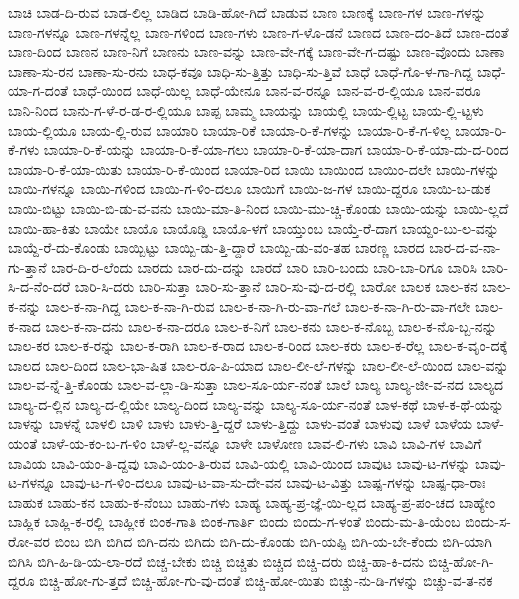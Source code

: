 {ಬಾಚಿ
ಬಾಡ-ದಿ-ರುವ
ಬಾಡ-ಲಿಲ್ಲ
ಬಾಡಿದ
ಬಾಡಿ-ಹೋ-ಗಿದೆ
ಬಾಡುವ
ಬಾಣ
ಬಾಣಕ್ಕೆ
ಬಾಣ-ಗಳ
ಬಾಣ-ಗಳನ್ನು
ಬಾಣ-ಗಳನ್ನೂ
ಬಾಣ-ಗಳನ್ನೆಲ್ಲ
ಬಾಣ-ಗಳಿಂದ
ಬಾಣ-ಗಳು
ಬಾಣ-ಗ-ಳೊ-ಡನೆ
ಬಾಣದ
ಬಾಣ-ದಂ-ತಿದೆ
ಬಾಣ-ದಂತೆ
ಬಾಣ-ದಿಂದ
ಬಾಣನ
ಬಾಣ-ನಿಗೆ
ಬಾಣನು
ಬಾಣ-ವನ್ನು
ಬಾಣ-ವೇ-ಗಕ್ಕೆ
ಬಾಣ-ವೇ-ಗ-ದಷ್ಟು
ಬಾಣ-ವೊಂದು
ಬಾಣಾ
ಬಾಣಾ-ಸು-ರನ
ಬಾಣಾ-ಸು-ರನು
ಬಾಧ-ಕವೂ
ಬಾಧಿ-ಸು-ತ್ತಿತ್ತು
ಬಾಧಿ-ಸು-ತ್ತಿವೆ
ಬಾಧೆ
ಬಾಧೆ-ಗೊ-ಳ-ಗಾ-ಗಿದ್ದ
ಬಾಧೆ-ಯಾ-ಗ-ದಂತೆ
ಬಾಧೆ-ಯಿಂದ
ಬಾಧೆ-ಯಿಲ್ಲ
ಬಾಧೆ-ಯೇನೂ
ಬಾನ-ವ-ರನ್ನೂ
ಬಾನ-ವ-ರ-ಲ್ಲಿಯೂ
ಬಾನ-ವರೂ
ಬಾನಿ-ನಿಂದ
ಬಾನು-ಗ-ಳೆ-ರ-ಡ-ರ-ಲ್ಲಿಯೂ
ಬಾಪ್ಪ
ಬಾಮ್ಮ
ಬಾಯನ್ನು
ಬಾಯಲ್ಲಿ
ಬಾಯ-ಲ್ಲಿಟ್ಟ
ಬಾಯ-ಲ್ಲಿ-ಟ್ಟಳು
ಬಾಯ-ಲ್ಲಿಯೂ
ಬಾಯ-ಲ್ಲಿ-ರುವ
ಬಾಯಾರಿ
ಬಾಯಾ-ರಿಕೆ
ಬಾಯಾ-ರಿ-ಕೆ-ಗಳನ್ನು
ಬಾಯಾ-ರಿ-ಕೆ-ಗ-ಳಿಲ್ಲ
ಬಾಯಾ-ರಿ-ಕೆ-ಗಳು
ಬಾಯಾ-ರಿ-ಕೆ-ಯನ್ನು
ಬಾಯಾ-ರಿ-ಕೆ-ಯಾ-ಗಲು
ಬಾಯಾ-ರಿ-ಕೆ-ಯಾ-ದಾಗ
ಬಾಯಾ-ರಿ-ಕೆ-ಯಾ-ದು-ದ-ರಿಂದ
ಬಾಯಾ-ರಿ-ಕೆ-ಯಾ-ಯಿತು
ಬಾಯಾ-ರಿ-ಕೆ-ಯಿಂದ
ಬಾಯಾ-ರಿದ
ಬಾಯಿ
ಬಾಯಿಂದ
ಬಾಯಿಂ-ದಲೇ
ಬಾಯಿ-ಗಳನ್ನು
ಬಾಯಿ-ಗಳನ್ನೂ
ಬಾಯಿ-ಗಳಿಂದ
ಬಾಯಿ-ಗ-ಳಿಂ-ದಲೂ
ಬಾಯಿಗೆ
ಬಾಯಿ-ಜ-ಗಳ
ಬಾಯಿ-ದ್ದರೂ
ಬಾಯಿ-ಬ-ಡುಕ
ಬಾಯಿ-ಬಿಟ್ಟು
ಬಾಯಿ-ಬಿ-ಡು-ವ-ವನು
ಬಾಯಿ-ಮಾ-ತಿ-ನಿಂದ
ಬಾಯಿ-ಮು-ಚ್ಚಿ-ಕೊಂಡು
ಬಾಯಿ-ಯನ್ನು
ಬಾಯಿ-ಲ್ಲದೆ
ಬಾಯಿ-ಹಾ-ಕಿತು
ಬಾಯೇ
ಬಾಯೊ
ಬಾಯೊಡ್ಡಿ
ಬಾಯೊ-ಳಗೆ
ಬಾಯ್ತುಂಬ
ಬಾಯ್ತೆ-ರೆ-ದಾಗ
ಬಾಯ್ದಂ-ಬು-ಲ-ವನ್ನು
ಬಾಯ್ದೆ-ರೆ-ದು-ಕೊಂಡು
ಬಾಯ್ಬಿಟ್ಟು
ಬಾಯ್ಬಿ-ಡು-ತ್ತಿ-ದ್ದಾರೆ
ಬಾಯ್ಬಿ-ಡು-ವಂ-ತಹ
ಬಾರಣ್ಣ
ಬಾರದ
ಬಾರ-ದ-ವ-ನಾ-ಗು-ತ್ತಾನೆ
ಬಾರ-ದಿ-ರ-ಲೆಂದು
ಬಾರದು
ಬಾರ-ದು-ದನ್ನು
ಬಾರದೆ
ಬಾರಿ
ಬಾರಿ-ಬಂದು
ಬಾರಿ-ಬಾ-ರಿಗೂ
ಬಾರಿಸಿ
ಬಾರಿ-ಸಿ-ದ-ನೆಂ-ದರೆ
ಬಾರಿ-ಸಿ-ದರು
ಬಾರಿ-ಸುತ್ತಾ
ಬಾರಿ-ಸು-ತ್ತಾನೆ
ಬಾರಿ-ಸು-ವು-ದ-ರಲ್ಲಿ
ಬಾರೋ
ಬಾಲಕ
ಬಾಲ-ಕನ
ಬಾಲ-ಕ-ನನ್ನು
ಬಾಲ-ಕ-ನಾ-ಗಿದ್ದ
ಬಾಲ-ಕ-ನಾ-ಗಿ-ರುವ
ಬಾಲ-ಕ-ನಾ-ಗಿ-ರು-ವಾ-ಗಲೆ
ಬಾಲ-ಕ-ನಾ-ಗಿ-ರು-ವಾ-ಗಲೇ
ಬಾಲ-ಕ-ನಾದ
ಬಾಲ-ಕ-ನಾ-ದನು
ಬಾಲ-ಕ-ನಾ-ದರೂ
ಬಾಲ-ಕ-ನಿಗೆ
ಬಾಲ-ಕನು
ಬಾಲ-ಕ-ನೊಬ್ಬ
ಬಾಲ-ಕ-ನೊ-ಬ್ಬ-ನನ್ನು
ಬಾಲ-ಕರ
ಬಾಲ-ಕ-ರನ್ನು
ಬಾಲ-ಕ-ರಾಗಿ
ಬಾಲ-ಕ-ರಾದ
ಬಾಲ-ಕ-ರಿಂದ
ಬಾಲ-ಕರು
ಬಾಲ-ಕ-ರೆಲ್ಲ
ಬಾಲ-ಕ-ವೃಂ-ದಕ್ಕೆ
ಬಾಲದ
ಬಾಲ-ದಿಂದ
ಬಾಲ-ಭಾ-ಷಿತ
ಬಾಲ-ರೂ-ಪಿ-ಯಾದ
ಬಾಲ-ಲೀ-ಲೆ-ಗಳನ್ನು
ಬಾಲ-ಲೀ-ಲೆ-ಯಿಂದ
ಬಾಲ-ವನ್ನು
ಬಾಲ-ವ-ನ್ನೆ-ತ್ತಿ-ಕೊಂಡು
ಬಾಲ-ವ-ಲ್ಲಾ-ಡಿ-ಸುತ್ತಾ
ಬಾಲ-ಸೂ-ರ್ಯ-ನಂತೆ
ಬಾಲೆ
ಬಾಲ್ಯ
ಬಾಲ್ಯ-ಜೀ-ವ-ನದ
ಬಾಲ್ಯದ
ಬಾಲ್ಯ-ದ-ಲ್ಲಿನ
ಬಾಲ್ಯ-ದ-ಲ್ಲಿಯೇ
ಬಾಲ್ಯ-ದಿಂದ
ಬಾಲ್ಯ-ವನ್ನು
ಬಾಲ್ಯ-ಸೂ-ರ್ಯ-ನಂತೆ
ಬಾಳ-ಕಥೆ
ಬಾಳ-ಕ-ಥೆ-ಯನ್ನು
ಬಾಳನ್ನು
ಬಾಳನ್ನೆ
ಬಾಳಲಿ
ಬಾಳಿ
ಬಾಳು
ಬಾಳು-ತ್ತಿ-ದ್ದರೆ
ಬಾಳು-ತ್ತಿದ್ದು
ಬಾಳು-ವಂತೆ
ಬಾಳುವು
ಬಾಳೆ
ಬಾಳೆಯ
ಬಾಳೆ-ಯಂತೆ
ಬಾಳೆ-ಯ-ಕಂ-ಬ-ಗ-ಳಿಂ
ಬಾಳೆ-ಲ್ಲ-ವನ್ನೂ
ಬಾಳೇ
ಬಾಳೋಣ
ಬಾವ-ಲಿ-ಗಳು
ಬಾವಿ
ಬಾವಿ-ಗಳ
ಬಾವಿಗೆ
ಬಾವಿಯ
ಬಾವಿ-ಯಂ-ತಿ-ದ್ದವು
ಬಾವಿ-ಯಂ-ತಿ-ರುವ
ಬಾವಿ-ಯಲ್ಲಿ
ಬಾವಿ-ಯಿಂದ
ಬಾವುಟ
ಬಾವು-ಟ-ಗಳನ್ನು
ಬಾವು-ಟ-ಗಳನ್ನೂ
ಬಾವು-ಟ-ಗ-ಳಿಂ-ದಲೂ
ಬಾವು-ಟ-ವಾ-ಸು-ದೇ-ವನ
ಬಾವು-ಟ-ವಿತ್ತು
ಬಾಷ್ಪ-ಗಳನ್ನು
ಬಾಷ್ಪ-ಧಾ-ರಾಃ
ಬಾಹುಕ
ಬಾಹು-ಕನ
ಬಾಹು-ಕ-ನೆಂಬು
ಬಾಹು-ಗಳು
ಬಾಹ್ಯ
ಬಾಹ್ಯ-ಪ್ರ-ಜ್ಞೆ-ಯಿ-ಲ್ಲದ
ಬಾಹ್ಯ-ಪ್ರ-ಪಂ-ಚದ
ಬಾಹ್ಯೇಂ
ಬಾಹ್ಲಿಕ
ಬಾಹ್ಲಿ-ಕ-ರಲ್ಲಿ
ಬಾಹ್ಲೀಕ
ಬಿಂಕ-ಗಾತಿ
ಬಿಂಕ-ಗಾರ್ತಿ
ಬಿಂದು
ಬಿಂದು-ಗ-ಳಂತೆ
ಬಿಂದು-ಮ-ತಿ-ಯೆಂಬ
ಬಿಂದು-ಸ-ರೋ-ವರ
ಬಿಂಬ
ಬಿಗಿ
ಬಿಗಿದ
ಬಿಗಿ-ದನು
ಬಿಗಿದು
ಬಿಗಿ-ದು-ಕೊಂಡು
ಬಿಗಿ-ಯಪ್ಪಿ
ಬಿಗಿ-ಯ-ಬೇ-ಕೆಂದು
ಬಿಗಿ-ಯಾಗಿ
ಬಿಗಿಸಿ
ಬಿಗಿ-ಹಿ-ಡಿ-ಯ-ಲಾ-ರದೆ
ಬಿಚ್ಚ-ಬೇಕು
ಬಿಚ್ಚಿ
ಬಿಚ್ಚಿತು
ಬಿಚ್ಚಿದ
ಬಿಚ್ಚಿ-ದರು
ಬಿಚ್ಚಿ-ಹಾ-ಕಿ-ದನು
ಬಿಚ್ಚಿ-ಹೋ-ಗಿ-ದ್ದರೂ
ಬಿಚ್ಚಿ-ಹೋ-ಗು-ತ್ತದೆ
ಬಿಚ್ಚಿ-ಹೋ-ಗು-ವು-ದಂತೆ
ಬಿಚ್ಚಿ-ಹೋ-ಯಿತು
ಬಿಚ್ಚು-ನು-ಡಿ-ಗಳನ್ನು
ಬಿಚ್ಚು-ವ-ತ-ನಕ
}
